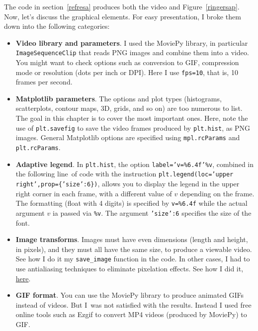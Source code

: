\documentclass[oneside,10pt]{book}
\begin{document}
The code in section~\ref{refresa} produces both the video and Figure~\ref{ringersap}. Now, let's discuss the graphical elements. 
 For easy presentation, I broke them down into the following categories:
\vspace{1ex}
\begin{itemize}
\item {\bf Video library and parameters}. I used the \textcolor{index}{MoviePy} library, in particular
 \texttt{ImageSequenceClip} that reads PNG images and combine them into a video. You might want to check options  
 such as conversion to GIF, compression mode or resolution (dots per inch or DPI). Here I use \texttt{fps=10}, that is, 10 frames per second.
\vspace{1ex}
\item {\bf Matplotlib parameters}. The options and plot types (histograms, scatterplots, contour maps, 3D, grids, and so on) are too numerous to list. The goal in this chapter 
 is to cover the most important ones. Here, note the use of \texttt{plt.savefig} to save the video frames produced 
 by \texttt{plt.hist}, as PNG images. General Matplotlib options are specified using 
\texttt{mpl.rcParams} and \texttt{plt.rcParams}.
\vspace{1ex}
\item {\bf Adaptive legend}.  In \texttt{plt.hist}, the option \texttt{label='v=\%6.4f'\%v}, combined in the following line~of code with the
instruction \texttt{plt.legend(loc='upper right',prop=\{'size':6\})},  allows you to display  the legend in the upper right corner in each frame,
 with a different value of $v$ depending on the frame. The formatting (float with 4 digits) is specified by  \texttt{\textquotesingle v=\%6.4f\textquotesingle} while
 the actual argument $v$ ia passed via \texttt{\%v}. The argument \texttt{'size':6} specifies the size of the font.
\vspace{1ex}
\item {\bf Image transforms}. Images must have even dimensions (length and height, in pixels), and they must all have the same size,
 to produce a viewable video. See how I do it my \texttt{save\_image} function in the code. In
 other cases, I had to use \textcolor{index}{antialiasing} techniques to eliminate 
\textcolor{index}{pixelation} effects. See how I did it, \href{https://github.com/VincentGranville/Visualizations/blob/main/Source-Code/image2R.py}{here}.
\vspace{1ex}
\item {\bf GIF format}. You can use the MoviePy library to produce animated GIFs instead of videos. But I~was not satisfied with the results. 
 Instead I used free online tools such as Ezgif to convert MP4 videos (produced by MoviePy) to GIF. 
\end{itemize}
\vspace{1ex}
\end{document}

